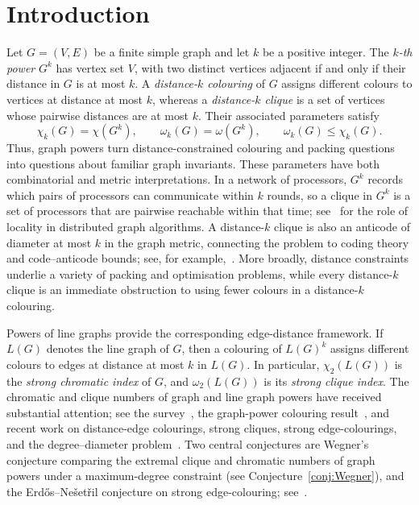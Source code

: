 \documentclass[10pt,a4paper]{article}
\theoremstyle{plain}
\numberwithin{equation}{section}
\begin{document}
\section{Introduction}
Let $G=(V,E)$ be a finite simple graph and let $k$ be a positive integer. The \emph{$k$-th power} $G^k$ has vertex set $V$, with two distinct vertices adjacent if and only if their distance in $G$ is at most $k$. A \emph{distance-$k$ colouring} of $G$ assigns different colours to vertices at distance at most $k$, whereas a \emph{distance-$k$ clique} is a set of vertices whose pairwise distances are at most $k$. Their associated parameters satisfy
\[
    \chi_k(G)=\chi(G^k),\qquad
    \omega_k(G)=\omega(G^k),\qquad
    \omega_k(G)\leq\chi_k(G).
\]
Thus, graph powers turn distance-constrained colouring and packing questions into questions about familiar graph invariants.
These parameters have both combinatorial and metric interpretations. In a network of processors, $G^k$ records which pairs of processors can communicate within $k$ rounds, so a clique in $G^k$ is a set of processors that are pairwise reachable within that time; see~\cite{Linial_1992} for the role of locality in distributed graph algorithms. A distance-$k$ clique is also an anticode of diameter at most $k$ in the graph metric, connecting the problem to coding theory and code--anticode bounds; see, for example,~\cite{Shi_Xia_Krotov_2023}. More broadly, distance constraints underlie a variety of packing and optimisation problems, while every distance-$k$ clique is an immediate obstruction to using fewer colours in a distance-$k$ colouring.

Powers of line graphs provide the corresponding edge-distance framework. If $L(G)$ denotes the line graph of $G$, then a colouring of $L(G)^k$ assigns different colours to edges at distance at most $k$ in $L(G)$. In particular, $\chi_2(L(G))$ is the \emph{strong chromatic index} of $G$, and $\omega_2(L(G))$ is its \emph{strong clique index}. The chromatic and clique numbers of graph and line graph powers have received substantial attention; see the survey~\cite{Cranston_2023}, the graph-power colouring result~\cite{Pierron_2024}, and recent work on distance-edge colourings, strong cliques, strong edge-colourings, and the degree--diameter problem~\cite{Abiad_Reijnders_2026,Kumar_Mohar_Pragada_2026,Davey_Hurley_Verclos_Kang_Volec_2026,vanBatenburg_Korsky_2026}. Two central conjectures are Wegner's conjecture comparing the extremal clique and chromatic numbers of graph powers under a maximum-degree constraint (see Conjecture~\ref{conj:Wegner}), and the Erd\H{o}s--Ne\v{s}et\v{r}il conjecture on strong edge-colouring; see~\cite[Sections~2 and~4]{Cranston_2023}. %
\end{document}
